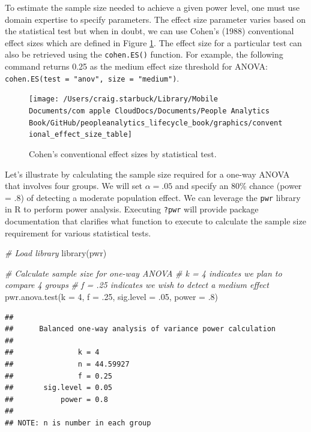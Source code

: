 \documentclass[
]{book}
\newenvironment{Shaded}{\begin{snugshade}}{\end{snugshade}}
\newcommand{\AttributeTok}[1]{\textcolor[rgb]{0.77,0.63,0.00}{#1}}
\newcommand{\CommentTok}[1]{\textcolor[rgb]{0.56,0.35,0.01}{\textit{#1}}}
\newcommand{\DecValTok}[1]{\textcolor[rgb]{0.00,0.00,0.81}{#1}}
\newcommand{\FunctionTok}[1]{\textcolor[rgb]{0.00,0.00,0.00}{#1}}
\newcommand{\NormalTok}[1]{#1}
\begin{document}
To estimate the sample size needed to achieve a given power level, one must use domain expertise to specify parameters. The effect size parameter varies based on the statistical test but when in doubt, we can use Cohen's (1988) conventional effect sizes which are defined in Figure \ref{fig:conv-eff-size-tbl}. The effect size for a particular test can also be retrieved using the \texttt{cohen.ES()} function. For example, the following command returns 0.25 as the medium effect size threshold for ANOVA: \texttt{cohen.ES(test\ =\ "anov",\ size\ =\ "medium")}.

\begin{figure}

{\centering \texttt{[image: /Users/craig.starbuck/Library/Mobile Documents/com~apple~CloudDocs/Documents/People Analytics Book/GitHub/peopleanalytics\_lifecycle\_book/graphics/conventional\_effect\_size\_table]} 

}

\caption{Cohen's conventional effect sizes by statistical test.}\label{fig:conv-eff-size-tbl}
\end{figure}

Let's illustrate by calculating the sample size required for a one-way ANOVA that involves four groups. We will set \(\alpha = .05\) and specify an 80\% chance (power = .8) of detecting a moderate population effect. We can leverage the \texttt{pwr} library in R to perform power analysis. Executing \texttt{?pwr} will provide package documentation that clarifies what function to execute to calculate the sample size requirement for various statistical tests.

\begin{Shaded}
\begin{Highlighting}[]
\CommentTok{\# Load library}
\FunctionTok{library}\NormalTok{(pwr)}

\CommentTok{\# Calculate sample size for one{-}way ANOVA}
\CommentTok{\# k = 4 indicates we plan to compare 4 groups}
\CommentTok{\# f = .25 indicates we wish to detect a medium effect}
\FunctionTok{pwr.anova.test}\NormalTok{(}\AttributeTok{k =} \DecValTok{4}\NormalTok{, }\AttributeTok{f =}\NormalTok{ .}\DecValTok{25}\NormalTok{, }\AttributeTok{sig.level =}\NormalTok{ .}\DecValTok{05}\NormalTok{, }\AttributeTok{power =}\NormalTok{ .}\DecValTok{8}\NormalTok{)}
\end{Highlighting}
\end{Shaded}

\begin{verbatim}
## 
##      Balanced one-way analysis of variance power calculation 
## 
##               k = 4
##               n = 44.59927
##               f = 0.25
##       sig.level = 0.05
##           power = 0.8
## 
## NOTE: n is number in each group
\end{verbatim}
\end{document}
